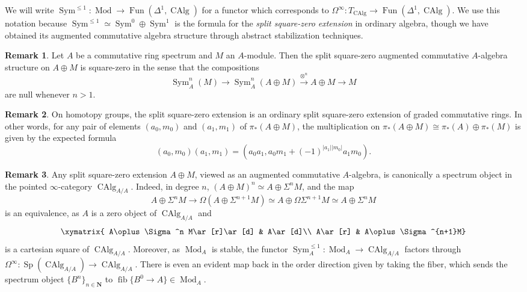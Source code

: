 \documentclass[12pt]{article}
\theoremstyle{definition}
\newtheorem{remark}{Remark}[subsection]
\newcommand{\NN}{\mathbf{N}}
\newcommand{\too}{\longrightarrow}
\DeclareMathOperator{\Mod}{Mod}
\DeclareMathOperator{\CAlg}{CAlg}
\DeclareMathOperator{\Fun}{Fun}
\DeclareMathOperator{\Sym}{Sym}
\DeclareMathOperator{\fib}{fib}
\DeclareMathOperator{\Sp}{Sp}
\begin{document}
We will write $\Sym^{\leq 1}:\Mod\to\Fun(\Delta^1,\CAlg)$
\index{$\Sym^{\leq 1}$}
for a functor which corresponds to $\Omega^\infty:T_{\CAlg}\to\Fun(\Delta^1,\CAlg)$.
We use this notation because $\Sym^{\leq 1}\simeq\Sym^0\oplus\Sym^1$ is the formula for the {\em split square-zero extension} in ordinary algebra, though we have obtained its augmented commutative algebra structure through abstract stabilization techniques.
\begin{remark}
Let $A$ be a commutative ring spectrum and $M$ an $A$-module.
Then the split square-zero augmented commutative $A$-algebra structure on $A\oplus M$ is square-zero in the sense that the compositions
\[
\Sym^n_A(M)\too\Sym^n_A(A\oplus M)\overset{\otimes^n}{\too} A\oplus M\too M
\]
are null whenever $n>1$.
\end{remark}
\begin{remark}
On homotopy groups, the split square-zero extension is an ordinary split square-zero extension of graded commutative rings.
In other words, for any pair of elements $(a_0,m_0)$ and $(a_1,m_1)$ of $\pi_*(A\oplus M)$, the multiplication on $\pi_*(A\oplus M)\cong\pi_*(A)\oplus\pi_*(M)$ is given by the expected formula
\[
(a_0,m_0)(a_1,m_1)=(a_0a_1,a_0m_1+(-1)^{|a_1||m_0|}a_1m_0).
\]
\end{remark}

\begin{remark}
Any split square-zero extension $A\oplus M$, viewed as an augmented commutative $A$-algebra, is canonically a spectrum object in the pointed $\infty$-category $\CAlg_{A/A}$. Indeed, in degree $n$,
$(A\oplus M)^n\simeq A\oplus\Sigma^n M$, and the map
\[
A\oplus\Sigma^n M\too\Omega(A\oplus\Sigma^{n+1} M)\simeq A\oplus\Omega\Sigma^{n+1}M\simeq A\oplus\Sigma^n M
\]
is an equivalence, as $A$ is a zero object of $\CAlg_{A/A}$ and
\[
\xymatrix{
A\oplus\Sigma^n M\ar[r]\ar[d] & A\ar[d]\\
A\ar[r] & A\oplus\Sigma^{n+1}M}
\]
is a cartesian square of $\CAlg_{A/A}$.
Moreover, as $\Mod_A$ is stable, the functor $\Sym^{\leq 1}_A:\Mod_A\to\CAlg_{A/A}$ factors through $\Omega^\infty:\Sp(\CAlg_{A/A})\to\CAlg_{A/A}$.
There is even an evident map back in the order direction given by taking the fiber, which sends the spectrum object $\{B^n\}_{n\in\NN}$ to $\fib\{B^0\to A\}\in\Mod_A$.
\end{remark}
\end{document}
